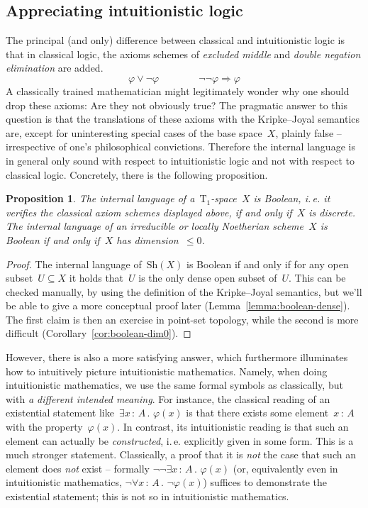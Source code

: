 \documentclass[10pt]{amsart}
\makeatletter
\theoremstyle{definition}
\theoremstyle{plain}
\newtheorem{prop}[defn]{Proposition}
\theoremstyle{remark}
\newcommand{\Sh}{\mathrm{Sh}}
\newcommand{\?}{\,{:}\,}
\renewcommand{\_}{\mathpunct{.}\,}
\newcommand{\ie}{i.\,e.\@\xspace}
\makeatother
\begin{document}
\subsection{Appreciating intuitionistic logic}
\label{sect:appreciating-intuitionistic-logic}
The principal (and only) difference between classical and intuitionistic logic
is that in classical logic, the axioms schemes of \emph{excluded middle} and
\emph{double negation elimination} are added.
\[ \varphi \vee \neg\varphi \qquad\qquad \neg\neg\varphi \Rightarrow \varphi \]
A classically trained mathematician might legitimately wonder why one should
drop these axioms: Are they not obviously true? The pragmatic answer to this
question is that the translations of these axioms with the Kripke--Joyal
semantics are, except for uninteresting special cases of the base space~$X$,
plainly false -- irrespective of one's philosophical convictions. Therefore the
internal language is in general only sound with respect to intuitionistic logic and
not with respect to classical logic. Concretely, there is the following
proposition.
\begin{prop}The internal language of
a~$\mathrm{T}_1$-space~$X$ is \emph{Boolean}, \ie it verifies the classical
axiom schemes displayed above, if and only if~$X$ is discrete.
The internal language of an irreducible or locally Noetherian scheme~$X$ is Boolean if and only if~$X$ has
dimension~$\leq 0$.
\end{prop}
\begin{proof}\label{prop:lang-boolean}
The internal language of~$\Sh(X)$ is Boolean if and only if for
any open subset~$U \subseteq X$ it holds that~$U$ is the only dense open subset
of~$U$. This can be checked manually, by using the definition of the
Kripke--Joyal semantics, but we'll be able to give a more conceptual proof
later (Lemma~\ref{lemma:boolean-dense}). The first claim is then an exercise in
point-set topology, while the second is more difficult
(Corollary~\ref{cor:boolean-dim0}).
\end{proof}

However, there is also a more satisfying answer, which furthermore
illuminates how to intuitively picture intuitionistic mathematics.
Namely, when doing intuitionistic mathematics, we use the same formal symbols as classically, but with
\emph{a different intended meaning}. For instance, the classical reading of an
existential statement like~$\exists x\?A\_ \varphi(x)$ is that there exists
some element~$x \? A$ with the property~$\varphi(x)$. In contrast, its
intuitionistic reading is that such an element can actually be
\emph{constructed}, \ie explicitly given in some form. This is a much stronger
statement. Classically, a proof that it is \emph{not} the case that such an
element does \emph{not} exist -- formally $\neg\neg \exists x\?A\_ \varphi(x)$
(or, equivalently even in intuitionistic mathematics, $\neg\forall x\? A\_
\neg\varphi(x)$) suffices to demonstrate the existential statement; this is not
so in intuitionistic mathematics.
\end{document}
